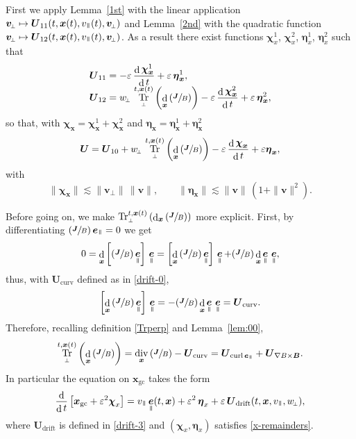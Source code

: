 \documentclass[10pt]{amsart}
\newcommand\mto{\mathchoice{\longmapsto}{\mapsto}{\mapsto}{\mapsto}}
\newcommand{\sperp}{{\scriptscriptstyle\perp}}
\newcommand{\Psfrac}[2]{(\sfrac{#1}{#2})}
\let\eps\varepsilon
\DeclareMathOperator\dD{d}\let\dd\dD
\DeclareMathOperator{\Tr}{Tr}
\DeclareMathOperator{\Div}{div}
\DeclareMathOperator{\Curl}{curl}
\theoremstyle{plain}
\theoremstyle{definition}
\newcommand{\be}{\begin{equation}}
\newcommand{\ee}{\end{equation}}
\newcommand\bB{{\boldsymbol B}}
\newcommand\bJ{{\boldsymbol J}}
\newcommand\bU{{\boldsymbol U}}
\let\bfU\bU
\newcommand\bfv{{\boldsymbol v}}
\newcommand\bfx{{\boldsymbol x}}
\newcommand\bfeta{{\boldsymbol \eta}}
\newcommand\bfchi{{\boldsymbol \chi}}
\DeclareMathOperator{\beD}{\boldsymbol{e}}
\newcommand\eDpar{\beD_\mypar}
\newcommand\vpar{v_\mypar}
\newcommand\bvperp{\bfv_{\!\sperp}}
\newcommand\eperp{w_{\!\sperp}}
\newcommand{\Trperp}[1]{\Tr_\sperp^{#1}}
\newcommand{\GC}{\bfx_\mathrm{gc}}
\newcommand{\gradB}{\bU_{\nabla B\times\bB}}
\newcommand{\curvB}{\bU_{\mathrm{curv}}}
\newcommand{\rotB}{\bU_{\Curl\eDpar}}
\newcommand{\Ud}{\bU_{\mathrm{drift}}}
\newcommand{\mypar}{{\mkern3mu\vphantom{\perp}\vrule depth 0pt\mkern2mu\vrule depth 0pt\mkern3mu}}
\begin{document}
First we apply Lemma~\ref{1st} with the linear application $\bvperp\mto \bfU_{11}(t,\bfx(t),\vpar(t), \bvperp)$ and Lemma~\ref{2nd} with the quadratic function $\bvperp\mto \bfU_{12}(t,\bfx(t),\vpar(t), \bvperp)$. As a result there exist functions $\bfchi_x^1$, $\bfchi_x^2$, $\bfeta_x^1$, $\bfeta_x^2$ such that
\begin{align*}
\bfU_{11}&= -\eps\,\frac{\dD
\bfchi_\bfx^1}{\dD t} + \eps\,\bfeta_\bfx^1,\\[-5pt]
\bfU_{12}&=
\eperp\,\Trperp{t,\bfx(t)}\left(\dD_\bfx\left(\sfrac{\bJ}{B}\right)\right) -\eps\,\frac{\dD
\bfchi_\bfx^2}{\dD t} + \eps\,\bfeta_\bfx^2,
\end{align*}
so that, with $\bfchi_\bfx=\bfchi_\bfx^1+\bfchi_\bfx^2$ and $\bfeta_\bfx =\bfeta_\bfx^1
+\bfeta_\bfx^2$
\[
\bU=\bU_{10}+\eperp\,\Trperp{t,\bfx(t)}\left(\dD_\bfx\left(\sfrac{\bJ}{B}\right)\right)
-\eps\,\frac{\dD\bfchi_\bfx}{\dD t}+\eps\bfeta_\bfx,
\]
with
\be\label{x-remainders}
\|\bfchi_\bfx\|\lesssim \|\bvperp\|\,\|\bfv\|,\qquad
\|\bfeta_\bfx\| \lesssim \|\bfv\|\,(1+\|\bfv\|^2).
\ee

Before going on, we make $\Trperp{t,\bfx(t)}\left(\dD_\bfx\left(\sfrac{\bJ}{B}\right)\right)$
more explicit. First, by differentiating $\Psfrac{\bJ}{B} \eDpar=0$ we get
\[
0 = \dD_\bfx\left[\left(\sfrac{\bJ}{B}\right)\eDpar\right]\,\eDpar = \left[\dD_\bfx\left(\sfrac{\bJ}{B}\right)\eDpar\right]\,\eDpar + \Psfrac{\bJ}{B}\dD_\bfx \eDpar\,\eDpar,
\]
thus, with $\curvB$ defined as in \eqref{drift-0},
\[
\left[\dD_\bfx\left(\sfrac{\bJ}{B}\right)\eDpar\right]\,\eDpar =
-\Psfrac{\bJ}{B}\dD_\bfx \eDpar\,\eDpar = \curvB.
\]
Therefore, recalling definition \eqref{Trperp} and Lemma~\ref{lem:00},
\[
\Trperp{t,\bfx(t)}\left(\dD_\bfx\left(\sfrac{\bJ}{B}\right) \right)= \Div_\bfx\left(\sfrac{\bJ}{B}\right)
-\curvB= \rotB + \gradB.
\]
In particular the equation on $\GC$ takes the form
\[
\frac{\dD}{\dD t}\left[\GC+\eps^2\bfchi_x\right]
= \vpar\eDpar(t,\bfx)+\eps^2\,\bfeta_x +\eps\,\Ud(t,\bfx,\vpar,\eperp),
\]
where $\Ud$ is defined in \eqref{drift-3} and $(\bfchi_x,\bfeta_x)$ satisfies \eqref{x-remainders}.
\end{document}
